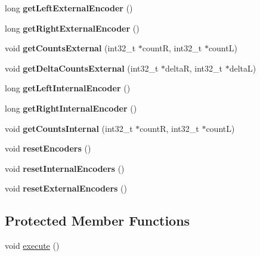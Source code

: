\begin{DoxyCompactItemize}
long {\bfseries get\+Left\+External\+Encoder} ()
\item 
\mbox{\label{classAsservEsialR_ab912ed84c7ed08b14e2d5c0765bc9cac}} 
long {\bfseries get\+Right\+External\+Encoder} ()
\item 
\mbox{\label{classAsservEsialR_abd83aa700363ae921569e178df53f95d}} 
void {\bfseries get\+Counts\+External} (int32\+\_\+t $\ast$countR, int32\+\_\+t $\ast$countL)
\item 
\mbox{\label{classAsservEsialR_a085b1191c4b4676c90df1d7ad944f48e}} 
void {\bfseries get\+Delta\+Counts\+External} (int32\+\_\+t $\ast$deltaR, int32\+\_\+t $\ast$deltaL)
\item 
\mbox{\label{classAsservEsialR_a12c935ad6369c88f2bbd994a2abbfe16}} 
long {\bfseries get\+Left\+Internal\+Encoder} ()
\item 
\mbox{\label{classAsservEsialR_a522a00c00cccec44db953f195c463927}} 
long {\bfseries get\+Right\+Internal\+Encoder} ()
\item 
\mbox{\label{classAsservEsialR_aefeb4e45f67c44c3f5a896274ef9da17}} 
void {\bfseries get\+Counts\+Internal} (int32\+\_\+t $\ast$countR, int32\+\_\+t $\ast$countL)
\item 
\mbox{\label{classAsservEsialR_aa1b04c8fca6b1fe1d095ed2befdc3b11}} 
void {\bfseries reset\+Encoders} ()
\item 
\mbox{\label{classAsservEsialR_a098ae002a5455809bde43fd1616f10a3}} 
void {\bfseries reset\+Internal\+Encoders} ()
\item 
\mbox{\label{classAsservEsialR_afce022c3f43439d0d5488fed31a46cc4}} 
void {\bfseries reset\+External\+Encoders} ()
\end{DoxyCompactItemize}
\subsection*{Protected Member Functions}
\begin{DoxyCompactItemize}
\item 
void \hyperlink{classAsservEsialR_abfd3be9bde7bf8ae887688bf8bc0ca43}{execute} ()
\end{DoxyCompactItemize}
